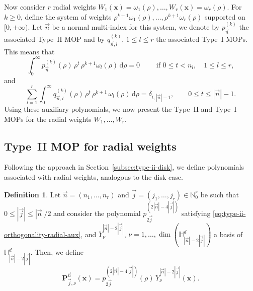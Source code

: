 \documentclass[a4paper]{article}
\theoremstyle{plain}
\theoremstyle{definition}
\newtheorem{definition}[theorem]{Definition}
\newcommand{\NN}{\mathbb{N}}
\newcommand{\dr}{\mathrm{d}}
\begin{document}
    Now consider $r$ radial weights $W_1(\mathbf x)=\omega_1(\rho),\dots,W_r(\mathbf x)=\omega_r(\rho)$. For $k\geq 0$, define the system of weights $\rho^{k+1}\omega_1(\rho), \dots, \rho^{k+1}\omega_r(\rho)$ supported on $[0,+\infty)$. Let $\vec n$ be a normal multi-index for this system, we denote by $p_{\vec n}^{(k)}$ the associated Type~II MOP and by $q_{\vec n,l}^{(k)}$, $1\leq l\leq r$ the associated Type~I MOPs. This means that
    \begin{equation}
        \label{eq:type-ii-orthogonality-radial-aux}
        \int_0^{\infty} p_{\vec n}^{(k)}(\rho)\, \rho^t\, \rho^{k+1}\omega_l(\rho)\,\dr \rho = 0\qquad\text{ if }0\leq t<n_l, \quad 1\leq l\leq r,
    \end{equation}
    and
    \begin{equation}
        \label{eq:type-i-orthogonality-radial-aux}
        \sum_{l=1}^r \int_0^{\infty} q_{\vec n,l}^{(k)}(\rho)\,\rho^t\,\rho^{k+1}\,\omega_l(\rho)\,\dr \rho = \delta_{t,|\vec n|-1}, \qquad 0\leq t \leq |\vec n|-1.
    \end{equation}
    Using these auxiliary polynomials, we now present the Type~II and Type~I MOPs for the radial weights $W_1,\dots, W_r$.

    \subsection{Type~II MOP for radial weights}
    

    Following the approach in Section~\ref{subsec:type-ii-disk}, we define polynomials associated with radial weights, analogous to the disk case.

    \begin{definition}  Let $\vec n = (n_1,\dots,n_r)$ and $\vec j = (j_1,\dots,j_r)\in\NN_0^r$ be such that $0\leq |\vec j| \leq |\vec n|/2$ and consider the polynomial $p_{2\vec j}^{(2|\vec n|-4|\vec j|)}$ satisfying \eqref{eq:type-ii-orthogonality-radial-aux}, and  $Y_\nu^{|\vec n|-2|\vec j|}$, $\nu=1,\dots,\dim(\mathbb H_{|\vec n|-2|\vec j|}^d)$ a basis of $\mathbb H_{|\vec n|-2|\vec j|}^d$. Then, we define
    \begin{equation}
        \label{eq:type-ii-radial}
        \mathbf P^{\vec n}_{\vec j,\nu}(\mathbf x) = p_{2\vec j}^{(2|\vec n|-4|\vec j|)}(\rho)\, Y_\nu^{|\vec n|-2|\vec j|}(\mathbf x).
    \end{equation}
    \end{definition}
    
\end{document}
